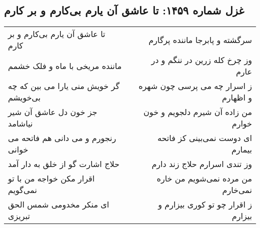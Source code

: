 \begin{center}
\section*{غزل شماره ۱۴۵۹: تا عاشق آن یارم بی‌کارم و بر کارم}
\label{sec:1459}
\begin{longtable}{l p{0.5cm} r}
تا عاشق آن یارم بی‌کارم و بر کارم
&&
سرگشته و پابرجا ماننده پرگارم
\\
ماننده مریخی با ماه و فلک خشمم
&&
وز چرخ کله زرین در ننگم و در عارم
\\
گر خویش منی یارا می بین که چه بی‌خویشم
&&
ز اسرار چه می پرسی چون شهره و اظهارم
\\
جز خون دل عاشق آن شیر نیاشامد
&&
من زاده آن شیرم دلجویم و خون خوارم
\\
رنجورم و می دانی هم فاتحه می خوانی
&&
ای دوست نمی‌بینی کز فاتحه بیمارم
\\
حلاج اشارت گو از خلق به دار آمد
&&
وز تندی اسرارم حلاج زند دارم
\\
اقرار مکن خواجه من با تو نمی‌گویم
&&
من مرده نمی‌شویم من خاره نمی‌خارم
\\
ای منکر مخدومی شمس الحق تبریزی
&&
ز اقرار چو تو کوری بیزارم و بیزارم
\\
\end{longtable}
\end{center}
